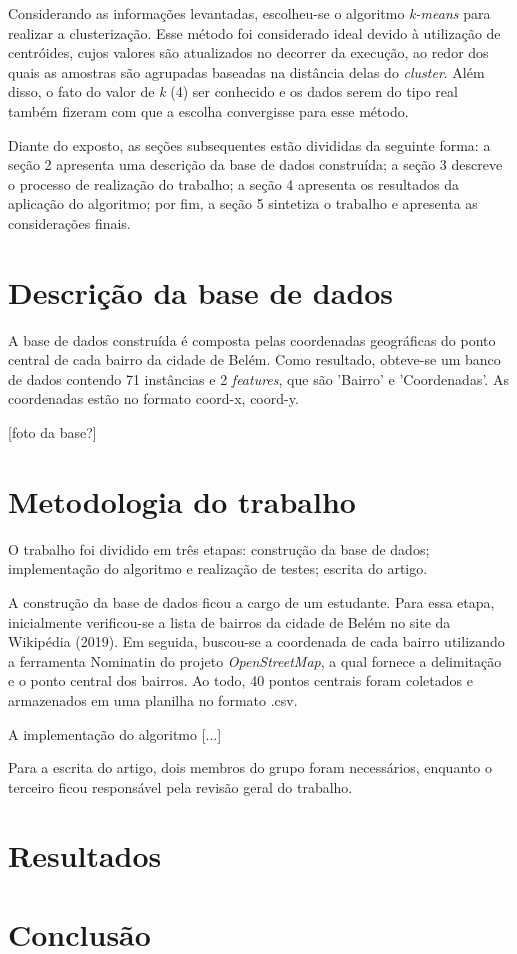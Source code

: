 \documentclass[12pt]{article}
\begin{document}
Considerando as informações levantadas, escolheu-se o algoritmo \textit{k-means} para realizar a clusterização. Esse método foi considerado ideal devido à utilização de centróides, cujos valores são atualizados no decorrer da execução, ao redor dos quais as amostras são agrupadas baseadas na distância delas do \textit{cluster}. Além disso, o fato do valor de \textit {k} (4) ser conhecido e os dados serem do tipo real também fizeram com que a escolha convergisse para esse método.

Diante do exposto, as seções subsequentes estão divididas da seguinte forma: a seção 2 apresenta uma descrição da base de dados construída; a seção 3 descreve o processo de realização do trabalho; a seção 4 apresenta os resultados da aplicação do algoritmo; por fim, a seção 5 sintetiza o trabalho e apresenta as considerações finais.






\section{Descrição da base de dados}
A base de dados construída é composta pelas coordenadas geográficas do ponto central de cada bairro da cidade de Belém. Como resultado, obteve-se um banco de dados contendo 71 instâncias e 2 \textit{features}, que são 'Bairro' e 'Coordenadas'. As coordenadas estão no formato coord-x, coord-y.



[foto da base?]

\section{Metodologia do trabalho}
O trabalho foi dividido em três etapas: construção da base de dados; implementação do algoritmo e realização de testes; escrita do artigo.

A construção da base de dados ficou a cargo de um estudante. Para essa etapa, inicialmente verificou-se a lista de bairros da cidade de Belém no site da Wikipédia (2019). Em seguida, buscou-se a coordenada de cada bairro utilizando a ferramenta Nominatin do projeto \textit{OpenStreetMap}, a qual fornece a delimitação e o ponto central dos bairros. Ao todo, 40 pontos centrais foram coletados e armazenados em uma planilha no formato .csv.

A implementação do algoritmo [...]

Para a escrita do artigo, dois membros do grupo foram necessários, enquanto o terceiro ficou responsável pela revisão geral do trabalho. 

\section{Resultados}

\section{Conclusão}




\end{document}
